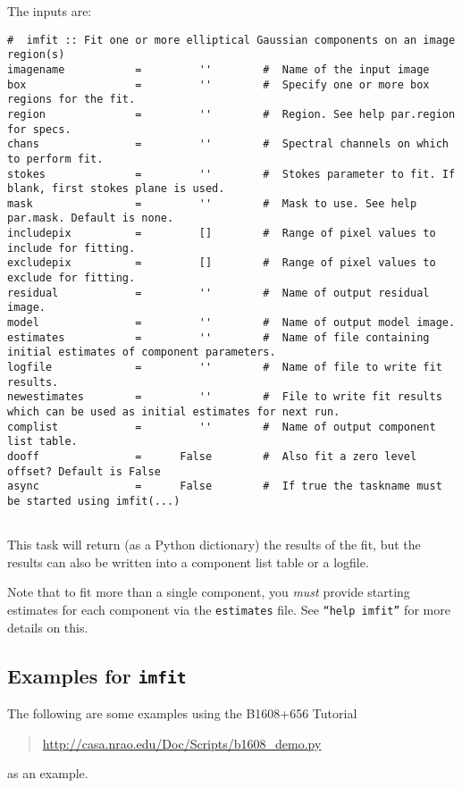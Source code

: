 The inputs are:
\small
\begin{verbatim}
#  imfit :: Fit one or more elliptical Gaussian components on an image region(s)
imagename           =         ''        #  Name of the input image
box                 =         ''        #  Specify one or more box regions for the fit.
region              =         ''        #  Region. See help par.region for specs.
chans               =         ''        #  Spectral channels on which to perform fit.
stokes              =         ''        #  Stokes parameter to fit. If blank, first stokes plane is used.
mask                =         ''        #  Mask to use. See help par.mask. Default is none.
includepix          =         []        #  Range of pixel values to include for fitting.
excludepix          =         []        #  Range of pixel values to exclude for fitting.
residual            =         ''        #  Name of output residual image.
model               =         ''        #  Name of output model image.
estimates           =         ''        #  Name of file containing initial estimates of component parameters.
logfile             =         ''        #  Name of file to write fit results.
newestimates        =         ''        #  File to write fit results which can be used as initial estimates for next run.
complist            =         ''        #  Name of output component list table.
dooff               =      False        #  Also fit a zero level offset? Default is False
async               =      False        #  If true the taskname must be started using imfit(...)


\end{verbatim}
\normalsize
This task will return (as a Python dictionary) the results of the fit,
but the results can also be written into a component list table or a
logfile. 
 
Note that to fit more than a single component, you {\em must} provide
starting estimates for each component via the {\tt estimates} file.
See {\tt ``help imfit''} for more details on this.

\subsection{Examples for {\tt imfit}}
\label{section:analysis.imfit.examples}

The following are some examples using the B1608+656 Tutorial
\begin{quote}
  \url{http://casa.nrao.edu/Doc/Scripts/b1608_demo.py}
\end{quote}
as an example.

